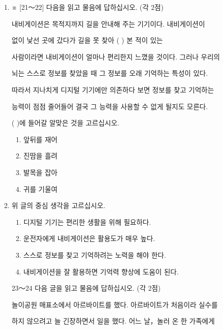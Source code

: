 \documentclass[12pt]{article}
\begin{document}
\begin{enumerate}[1.]
    \item ※ [21～22] 다음을 읽고 물음에 답하십시오. (각 2점)

    \begin{mdframed}
    내비게이션은 목적지까지 길을 안내해 주는 기기이다. 내비게이션이

    없이 낯선 곳에 갔다가 길을 못 찾아 (    ) 본 적이 있는

    사람이라면 내비게이션이 얼마나 편리한지 느꼈을 것이다. 그러나 우리의

    뇌는 스스로 정보를 찾았을 때 그 정보를 오래 기억하는 특성이 있다.

    따라서 지나치게 디지털 기기에만 의존하다 보면 정보를 찾고 기억하는

    능력이 점점 줄어들어 결국 그 능력을 사용할 수 없게 될지도 모른다.
    \end{mdframed}

    \bigskip

    (   )에 들어갈 알맞은 것을 고르십시오.

    \bigskip

    \begin{enumerate}[1)]
        \item 앞뒤를 재어
        \item 진땀을 흘려
        \item 발목을 잡아
        \item 귀를 기울여
    \end{enumerate}

    \item 위 글의 중심 생각을 고르십시오.

    \begin{enumerate}[1)]
        \item 디지털 기기는 편리한 생활을 위해 필요하다.
        \item 운전자에게 내비게이션은 활용도가 매우 높다.
        \item 스스로 정보를 찾고 기억하려는 노력을 해야 한다.
        \item 내비게이션을 잘 활용하면 기억력 향상에 도움이 된다.
    \end{enumerate}



    \item [23～24] 다음 글을 읽고 물음에 답하십시오. (각 2점)

    \begin{mdframed}
    놀이공원 매표소에서 아르바이트를 했다. 아르바이트가 처음이라 실수를

    하지 않으려고 늘 긴장하면서 일을 했다. 어느 날，놀러 온 한 가족에게


\end{mdframed}
\end{enumerate}
\end{document}
